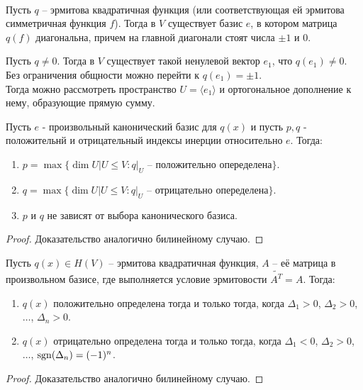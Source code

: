 \begin{theorem}~

    Пусть $q$ -- эрмитова квадратичная функция (или соответствующая ей эрмитова симметричная функция $f$).
    Тогда в $V$ существует базис $e$, в котором матрица $q(f)$ диагональна, причем на главной диагонали 
    стоят числа $\pm 1$ и $0$.
\end{theorem}

\begin{idea}
    Пусть $q \neq 0$. Тогда в $V$ существует такой ненулевой вектор $e_1$, что $q(e_1) \neq 0$.
    Без ограничения общности можно перейти к $q(e_1) = \pm 1$. \\ Тогда можно рассмотреть пространство 
    $U = \langle e_1 \rangle$ и ортогональное дополнение к нему, образующие прямую сумму.
\end{idea}

\begin{proposition}
    Пусть $e$ - произвольный канонический базис для $q(x)$ и пусть $p, q$ - положительнй и отрицательный
    индексы инерции относительно $e$. Тогда:
    \begin{enumerate}
        \item $p = \max \{\dim U | U \leq V: q \vert_{U} \text{ -- положительно опеределена}\}$.
        \item $q = \max \{\dim U | U \leq V: q \vert_{U} \text{ -- отрицательно опеределена}\}$.
        \item $p$ и $q$ не зависят от выбора канонического базиса.
    \end{enumerate}
\end{proposition}

\begin{proof}
    Доказательство аналогично билинейному случаю.
\end{proof}

\begin{proposition}
    Пусть $q(x) \in H(V)$ -- эрмитова квадратичная функция, $A$ -- её матрица в произвольном базисе, где 
    выполняется условие эрмитовости $\tilde{A^T} = A$. Тогда:
    \begin{enumerate}
        \item $q(x)$ положительно определена тогда и только тогда, когда $\Delta_1 > 0$, $\Delta_2 > 0$, $\dots$, 
        $\Delta_n > 0$.
        \item $q(x)$ отрицательно определена тогда и только тогда, когда $\Delta_1 < 0$, $\Delta_2 > 0$, $\dots$, 
        $\operatorname{sgn} (\Delta_n) = (-1)^n$.
    \end{enumerate}
\end{proposition}

\begin{proof}
    Доказательство аналогично билинейному случаю.
\end{proof}